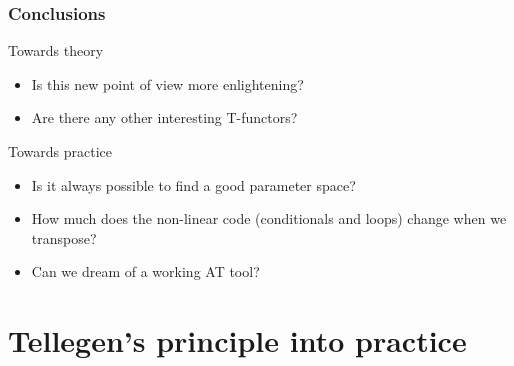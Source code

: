\documentclass[10pt]{beamer}
\begin{document}
\begin{frame}
  \frametitle{Conclusions}

  \begin{block}{Towards theory}
    \begin{itemize}
    \item Is this new point of view more enlightening?
    \item Are there any other interesting T-functors?
    \end{itemize}
  \end{block}

  \begin{block}{Towards practice}
    \begin{itemize}
    \item Is it always possible to find a good parameter space?
    \item How much does the non-linear code (conditionals and loops)
      change when we transpose?
    \item Can we dream of a working AT tool?
    \end{itemize}
  \end{block}
\end{frame}



\appendix

\section{Tellegen's principle into practice}
\end{document}
